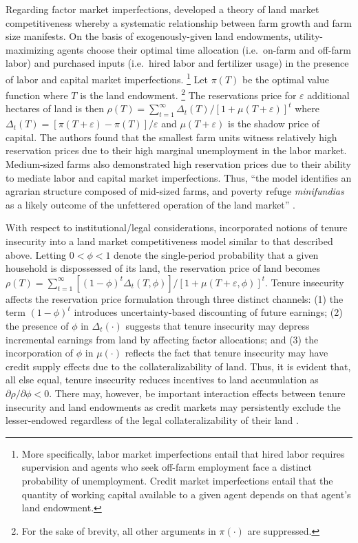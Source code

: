 \documentclass[english]{article}
\begin{document}
Regarding factor market imperfections, \citet{carter1993} developed a theory 
of land market competitiveness whereby a systematic relationship between farm 
growth and farm size manifests.
On the basis of exogenously-given land endowments, utility-maximizing 
agents choose their optimal time allocation 
(i.e.\ on-farm and off-farm labor) and purchased inputs 
(i.e.\ hired labor and fertilizer usage) in the presence of labor and 
capital market imperfections.%
\footnote{More specifically, labor market imperfections entail that hired 
labor requires supervision and agents who seek off-farm employment face a 
distinct probability of unemployment. 
Credit market imperfections entail that the quantity of working capital 
available to a given agent depends on that agent's land endowment.}
Let $\pi(T)$ be the optimal value function where $T$ is the land endowment.%
\footnote{For the sake of brevity, all other arguments in $\pi(\cdot)$ are 
suppressed.}
The reservations price for $\varepsilon$ additional hectares of land is then 
$\rho(T) = \sum_{t=1}^{\infty} \Delta_t(T)/[1 + \mu(T + \varepsilon)]^t$
where $\Delta_t(T) = [\pi(T + \varepsilon) - \pi(T)]/\varepsilon $ and 
$\mu(T + \varepsilon)$ is the shadow price of capital.
The authors found that the smallest farm units witness relatively high reservation 
prices due to their high marginal unemployment in the labor market. 
Medium-sized farms also demonstrated high reservation prices due to 
their ability to mediate labor and capital market imperfections.
Thus, ``the model identifies an agrarian structure composed of mid-sized farms,
and poverty refuge \emph{minifundias} as a likely outcome of the unfettered
operation of the land market'' \citep[pg.\ 1097]{carter1993}.

With respect to institutional/legal considerations, \citet{carter1998b} 
incorporated notions of tenure insecurity into a land market competitiveness 
model similar to that described above.
Letting $0 < \phi < 1$ denote the single-period probability that a given 
household is dispossessed of its land, the reservation price of land becomes 
$\rho(T) = \sum_{t=1}^{\infty} [(1 - \phi)^t \Delta_t(T, \phi)]/
[1 + \mu(T + \varepsilon, \phi)]^t$.
Tenure insecurity affects the reservation price formulation through three distinct
channels: (1) the term $(1 - \phi)^t$ introduces uncertainty-based discounting 
of future earnings; (2) the presence of $\phi$ in $\Delta_t(\cdot)$ suggests 
that tenure insecurity may depress incremental earnings from land by affecting 
factor allocations; and (3) the incorporation of $\phi$ in $\mu(\cdot)$ reflects 
the fact that tenure insecurity may have credit supply effects due to the 
collateralizability of land.
Thus, it is evident that, all else equal, tenure insecurity reduces incentives to 
land accumulation as $\partial \rho / \partial \phi < 0$.
There may, however, be important interaction effects between tenure insecurity
and land endowments as credit markets may persistently exclude the 
lesser-endowed regardless of the legal collateralizability of their land 
\citep{carter1988}.
\end{document}
